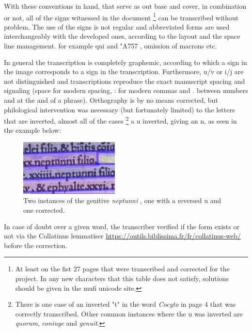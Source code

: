 \documentclass[12pt]{article}
\begin{document}
With these conventions in hand, that serve as out base and cover, in combination or not, all of the signs witnessed in the document \footnote{At least on the fist 27 pages that were transcribed and corrected for the project. In any new characters that this table does not satisfy, solutions should be given in the mufi unicode site.} can be transcribed without problem. The use of the signs is not regular and abbreviated forms are used interchangeably with the developed ones, according to the layout and the space line management. for example qui and \char"A757 , omission of macrons etc.

In general the transcription is completely graphemic, according to which a sign in the image corresponds to a sign in the transcription. Furthermore, u/v or i/j are not distinguished and transcriptions reproduce the exact manuscript spacing and signaling (space for modern spacing, : for modern commas and . between numbers and at the and of a phrase).
Orthography is by no means corrected, but philological intervention was necessary (but fortunately limited) to the letters that are inverted, almost all of the cases \footnote{There is one case of an inverted "t" in the word \textit{Cocyto} in page 4 that was correctly transcribed. Other common instances where the u was inverted are \textit{quorum}, \textit{coniuge} and \textit{genuit}. } a u inverted, giving an n, as seen in the example below:

\begin{figure}[!h]
    \centering
    \includegraphics[width=5cm]{neptunni.jpg}
    \caption{Two instances of the genitive \textit{neptunni} , one with a reversed u and one corrected.}
    \label{fig:SecFigure}
\end{figure}
In case of doubt over a given word, the transcriber verified if the form exists or not via the Collatinus lemmatiser \hyperref[Collatinus]{https://outils.biblissima.fr/fr/collatinus-web/} before the correction.
\end{document}
